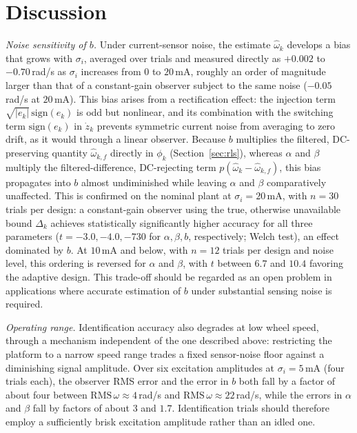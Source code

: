 \documentclass[letterpaper, 10 pt, conference]{ieeeconf}
\begin{document}
\section{Discussion}
\label{sec:discussion}
\emph{Noise sensitivity of $b$.} Under current-sensor noise, the estimate $\hat\omega_k$ develops a bias that grows with $\sigma_i$, averaged over trials and measured directly as $+0.002$ to $-0.70$\,rad/s as $\sigma_i$ increases from $0$ to $20$\,mA, roughly an order of magnitude larger than that of a constant-gain observer subject to the same noise ($-0.05$\,rad/s at $20$\,mA). This bias arises from a rectification effect: the injection term $\sqrt{|e_k|}\,\mathrm{sign}(e_k)$ is odd but nonlinear, and its combination with the switching term $\mathrm{sign}(e_k)$ in $\dot z_k$ prevents symmetric current noise from averaging to zero drift, as it would through a linear observer. Because $b$ multiplies the filtered, DC-preserving quantity $\hat\omega_{k,f}$ directly in $\phi_k$ (Section~\ref{sec:rls}), whereas $\alpha$ and $\beta$ multiply the filtered-difference, DC-rejecting term $p(\hat\omega_k-\hat\omega_{k,f})$, this bias propagates into $b$ almost undiminished while leaving $\alpha$ and $\beta$ comparatively unaffected. This is confirmed on the nominal plant at $\sigma_i=20$\,mA, with $n=30$ trials per design: a constant-gain observer using the true, otherwise unavailable bound $\Delta_k$ achieves statistically significantly higher accuracy for all three parameters ($t=-3.0,-4.0,-730$ for $\alpha,\beta,b$, respectively; Welch test), an effect dominated by $b$. At $10$\,mA and below, with $n=12$ trials per design and noise level, this ordering is reversed for $\alpha$ and $\beta$, with $t$ between $6.7$ and $10.4$ favoring the adaptive design. This trade-off should be regarded as an open problem in applications where accurate estimation of $b$ under substantial sensing noise is required.

\emph{Operating range.} Identification accuracy also degrades at low wheel speed, through a mechanism independent of the one described above: restricting the platform to a narrow speed range trades a fixed sensor-noise floor against a diminishing signal amplitude. Over six excitation amplitudes at $\sigma_i=5$\,mA (four trials each), the observer RMS error and the error in $b$ both fall by a factor of about four between $\mathrm{RMS}\,\omega\approx4$\,rad/s and $\mathrm{RMS}\,\omega\approx22$\,rad/s, while the errors in $\alpha$ and $\beta$ fall by factors of about $3$ and $1.7$. Identification trials should therefore employ a sufficiently brisk excitation amplitude rather than an idled one.
\end{document}
